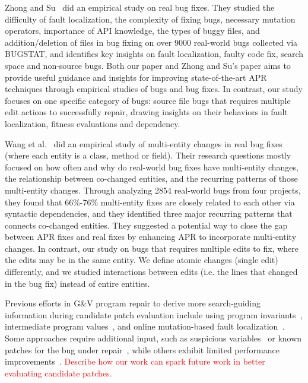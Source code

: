 \documentclass[sigconf, timestamp-false, anonymous=true]{acmart}
\newcommand\todo[1]{\textcolor{red}{#1}}
\begin{document}
Zhong and Su~\cite{zhong2015} did an empirical study on real bug fixes. 
They studied the difficulty of fault localization, the complexity of fixing bugs, 
necessary mutation operators, importance of API knowledge, the types of buggy files, 
and addition/deletion of files in bug fixing on over 9000 real-world bugs collected via BUGSTAT, 
and identifies key insights on fault localization, faulty code fix, search space and non-source bugs. 
Both our paper and Zhong and Su's paper aims to provide useful guidance and insights for 
improving state-of-the-art APR techniques through empirical studies of bugs and bug fixes. 
In contrast, our study focuses on one specific category of bugs: 
source file bugs that requires multiple edit actions to successfully repair, 
drawing insights on their behaviors in fault localization, fitness evaluations and dependency.

Wang et al.~\cite{wang2018} did an empirical study of multi-entity changes in real bug fixes 
(where each entity is a class, method or field). Their research questions mostly focused on 
how often and why do real-world bug fixes have multi-entity changes, the relationship 
between co-changed entities, and the recurring patterns of those multi-entity changes. 
Through analyzing 2854 real-world bugs from four projects, they found that 66\%-76\% 
multi-entity fixes are closely related to each other via syntactic dependencies, 
and they identified three major recurring patterns that connects co-changed entities. 
They suggested a potential way to close the gap between APR fixes and real fixes by 
enhancing APR to incorporate multi-entity changes. In contrast, our study on bugs that
requires multiple edits to fix, where the edits may be in the same entity. We define atomic 
changes (single edit) differently, and we studied interactions between edits 
(i.e. the lines that changed in the bug fix) instead of entire entities.

Previous efforts in G\&V program repair to derive more search-guiding information 
during candidate patch evaluation 
include using program invariants~\cite{better-fitness, dinglyu}, 
intermediate program values~\cite{source-code-checkpoint}, 
and online mutation-based fault localization~\cite{mut-analysis}.
Some approaches require additional input, such as suspicious variables~\cite{source-code-checkpoint} 
or known patches for the bug under repair~\cite{better-fitness}, 
while others exhibit limited performance improvements~\cite{dinglyu, mut-analysis}.
\todo{Describe how our work can spark future work in better evaluating candidate patches.}
\end{document}
